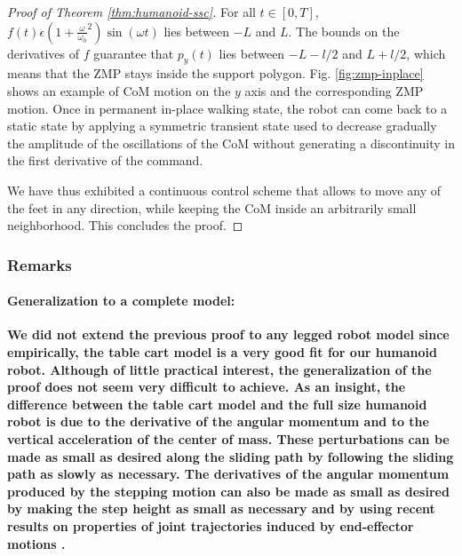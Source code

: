 \documentclass{article}
\begin{document}
\begin{proof}[Proof of Theorem \ref{thm:humanoid-ssc}]
For    all     $t    \in    [0,T]$,    $f(t)     \epsilon    (1    +
\frac{\omega}{\omega_0}^2)  \sin  (\omega t)$  lies  between $-L$  and
$L$. The bounds on the derivatives of $f$ guarantee that $p_y(t)$ lies
between  $-L- l/2$ and  $L+ l/2$,  which means  that the  ZMP stays
inside  the  support  polygon.  Fig.  \ref{fig:zmp-inplace}  shows  an
example  of CoM  motion  on the  $y$  axis and  the corresponding  ZMP
motion. Once in permanent in-place walking state, the robot can come back
to  a static  state by  applying a  symmetric transient  state  used to
decrease  gradually  the amplitude  of  the  oscillations  of the  CoM
without  generating a  discontinuity in  the first  derivative  of the
command.


We have thus exhibited a continuous control scheme that allows to move any of the feet
in any direction, while keeping the CoM inside an arbitrarily small neighborhood. This concludes
the proof.
\end{proof}


\subsubsection{Remarks}
\paragraph{Generalization to a complete model:} 
\textbf{We did not extend the previous proof to any legged robot model
  since empirically, the table cart model is a very good fit for our
  humanoid robot. Although of little practical interest, the
  generalization of the proof does not seem very difficult to
  achieve. As an insight, the difference between the table cart model
  and the full size humanoid robot is due to the derivative of the
  angular momentum and to the vertical acceleration of the center of
  mass. These perturbations can be made as small as desired along the
  sliding path by following the sliding path as slowly as
  necessary. The derivatives of the angular momentum produced by the
  stepping motion can also be made as small as desired by making the
  step height as small as necessary and by using recent results on
  properties of joint trajectories induced by end-effector motions
  \cite{Zanchettin6084763}.}
\end{document}

